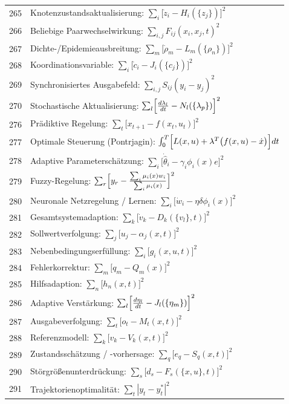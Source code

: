 \documentclass[11pt,a4paper]{article}
\begin{document}
\begin{longtable}{r l}
		265 & Knotenzustandsaktualisierung: $\sum_i\bigl[\dot z_i - H_i(\{z_j\})\bigr]^2$ \\
		266 & Beliebige Paarwechselwirkung: $\sum_{i,j}F_{ij}(x_i,x_j,t)^2$ \\
		267 & Dichte-/Epidemieausbreitung: $\sum_m\bigl[\dot\rho_m - L_m(\{\rho_n\})\bigr]^2$ \\
		268 & Koordinationsvariable: $\sum_i\bigl[\dot c_i - J_i(\{c_j\})\bigr]^2$ \\
		269 & Synchronisiertes Ausgabefeld: $\sum_{i,j}S_{ij}(y_i-y_j)^2$ \\
		270 & Stochastische Aktualisierung: $\sum_l\Bigl[\frac{d\lambda_l}{dt} - N_l(\{\lambda_p\})\Bigr]^2$ \\
		276 & Prädiktive Regelung: $\sum_t\bigl[x_{t+1} - f(x_t,u_t)\bigr]^2$ \\
		277 & Optimale Steuerung (Pontrjagin): $\int_0^T\Bigl[L(x,u) + \lambda^T\bigl(f(x,u)-\dot x\bigr)\Bigr]dt$ \\
		278 & Adaptive Parameterschätzung: $\sum_i\bigl[\dot{\hat\theta}_i - \gamma_i\phi_i(x)e\bigr]^2$ \\
		279 & Fuzzy-Regelung: $\sum_r\Bigl[y_r - \frac{\sum_i\mu_i(x)w_i}{\sum_i\mu_i(x)}\Bigr]^2$ \\
		280 & Neuronale Netzregelung / Lernen: $\sum_i\bigl[\dot w_i - \eta\delta\phi_i(x)\bigr]^2$ \\
		281 & Gesamtsystemadaption: $\sum_k\bigl[\dot v_k - D_k(\{v_l\},t)\Bigr]^2$ \\
		282 & Sollwertverfolgung: $\sum_j\bigl[u_j - \alpha_j(x,t)\Bigr]^2$ \\
		283 & Nebenbedingungserfüllung: $\sum_i\bigl[g_i(x,u,t)\bigr]^2$ \\
		284 & Fehlerkorrektur: $\sum_m\bigl[q_m - Q_m(x)\bigr]^2$ \\
		285 & Hilfsadaption: $\sum_n\bigl[h_n(x,t)\bigr]^2$ \\
		286 & Adaptive Verstärkung: $\sum_l\Bigl[\frac{d\eta_l}{dt} - J_l(\{\eta_m\})\Bigr]^2$ \\
		287 & Ausgabeverfolgung: $\sum_t\bigl[o_t - M_t(x,t)\Bigr]^2$ \\
		288 & Referenzmodell: $\sum_k\bigl[v_k - V_k(x,t)\bigr]^2$ \\
		289 & Zustandsschätzung / -vorhersage: $\sum_q\bigl[e_q - S_q(x,t)\bigr]^2$ \\
		290 & Störgrößenunterdrückung: $\sum_s\bigl[d_s - F_s(\{x,u\},t)\bigr]^2$ \\
		291 & Trajektorienoptimalität: $\sum_t|y_t - y_t^*|^2$ \\

\end{longtable}
\end{document}
